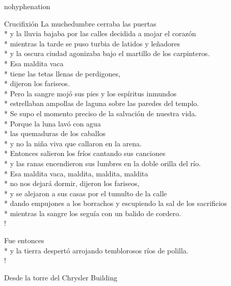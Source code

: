 \documentclass[
    a5paper,
    DIV=10,
    12pt,
    notitlepage,
    oneside,]
{scrbook} %
\begin{document}
\begin{hyphenrules}{nohyphenation}
\begin{poem}{Crucifixión}{}{}
La muchedumbre cerraba las puertas\\*
y la lluvia bajaba por las calles decidida a mojar el corazón\\*
mientras la tarde se puso turbia de latidos y leñadores\\*
y la oscura ciudad agonizaba bajo el martillo de los carpinteros.\\*
Esa maldita vaca\\*
tiene las tetas llenas de perdigones,\\*
dijeron los fariseos.\\*
Pero la sangre mojó sus pies y los espíritus inmundos\\*
estrellaban ampollas de laguna sobre las paredes del templo.\\*
Se supo el momento preciso de la salvación de nuestra vida.\\*
Porque la luna lavó con agua\\*
las quemaduras de los caballos\\*
y no la niña viva que callaron en la arena.\\*
Entonces salieron los fríos cantando sus canciones\\*
y las ranas encendieron sus lumbres en la doble orilla del río.\\*
Esa maldita vaca, maldita, maldita, maldita\\*
no nos dejará dormir, dijeron los fariseos,\\*
y se alejaron a sus casas por el tumulto de la calle\\*
dando empujones a los borrachos y escupiendo la sal de los sacrificios\\*
mientras la sangre los seguía con un balido de cordero.\\!

Fue entonces\\*
y la tierra despertó arrojando temblorosos ríos de polilla.\\!

\end{poem}


\begin{poem}{Desde la torre del Chrysler Building}{}{\vspace{-1em}}


\end{poem}
\end{hyphenrules}
\end{document}
